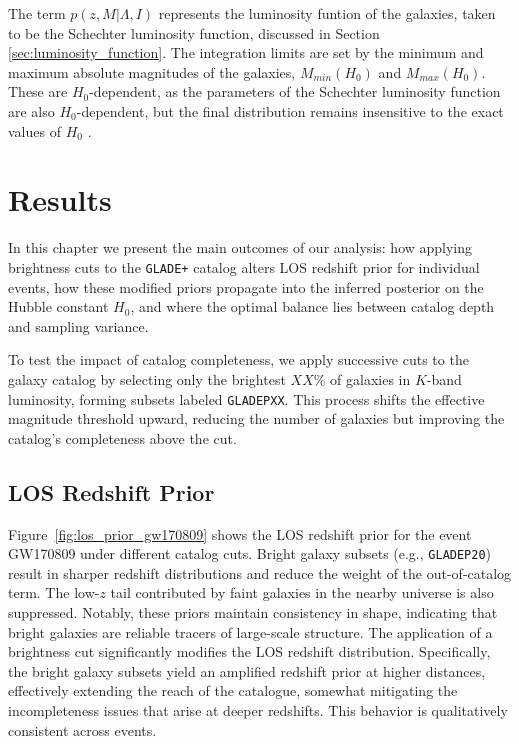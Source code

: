 The term $p(z,M|\Lambda, I)$ represents the luminosity funtion of the galaxies, taken to be the Schechter luminosity function, discussed in Section \ref{sec:luminosity_function}. The integration limits are set by the minimum and maximum absolute magnitudes of the galaxies, $M_{min}(H_0)$ and $M_{max}(H_0)$. These are $H_0$-dependent, as the parameters of the Schechter luminosity function are also $H_0$-dependent, but the final distribution remains insensitive to the exact values of $H_0$ \citep{gray2023joint}.

\section{Results}
In this chapter we present the main outcomes of our analysis: how applying brightness cuts to the \texttt{GLADE+} catalog alters \ac{LOS} redshift prior for individual events, how these modified priors propagate into the inferred posterior on the Hubble constant $H_0$, and where the optimal balance lies between catalog depth and sampling variance.

To test the impact of catalog completeness, we apply successive cuts to the galaxy catalog by selecting only the brightest $XX\%$ of galaxies in $K$-band luminosity, forming subsets labeled \texttt{GLADEPXX}. This process shifts the effective magnitude threshold upward, reducing the number of galaxies but improving the catalog's completeness above the cut.

\subsection{\ac{LOS} Redshift Prior}
Figure~\ref{fig:los_prior_gw170809} shows the LOS redshift prior for the event GW170809 under different catalog cuts. Bright galaxy subsets (e.g., \texttt{GLADEP20}) result in sharper redshift distributions and reduce the weight of the out-of-catalog term. The low-$z$ tail contributed by faint galaxies in the nearby universe is also suppressed. Notably, these priors maintain consistency in shape, indicating that bright galaxies are reliable tracers of large-scale structure. The application of a brightness cut significantly modifies the \ac{LOS} redshift distribution. Specifically, the bright galaxy subsets yield an amplified redshift prior at higher distances, effectively extending the reach of the catalogue, somewhat mitigating the incompleteness issues that arise at deeper redshifts. This behavior is qualitatively consistent across events.

